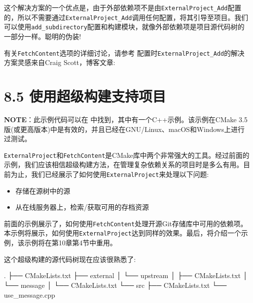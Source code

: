 这个解决方案的一个优点是，由于外部依赖项不是由\texttt{ExternalProject\_Add}配置的，所以不需要通过\texttt{ExternalProject\_Add}调用任何配置，将其引导至项目。我们可以使用\texttt{add\_subdirectory}配置和构建模块，就像外部依赖项是项目源代码树的一部分一样。聪明的伪装!


有关\texttt{FetchContent}选项的详细讨论，请参考 配置时\texttt{ExternalProject\_Add}的解决方案灵感来自Craig Scott，博客文章:


\section{8.5 使用超级构建支持项目}

\begin{myInfoBox}
\textbf{NOTE}：此示例代码可以在  中找到，其中有一个C++示例。该示例在CMake 3.5版(或更高版本)中是有效的，并且已经在GNU/Linux、macOS和Windows上进行过测试。
\end{myInfoBox}

\texttt{ExternalProject}和\texttt{FetchContent}是CMake库中两个非常强大的工具。经过前面的示例，我们应该相信超级构建方法，在管理复杂依赖关系的项目时是多么有用。目前为止，我们已经展示了如何使用\texttt{ExternalProject}来处理以下问题:

\begin{itemize}
\item 存储在源树中的源

\item 从在线服务器上，检索/获取可用的存档资源

\end{itemize}

前面的示例展示了，如何使用\texttt{FetchContent}处理开源Git存储库中可用的依赖项。本示例将展示，如何使用\texttt{ExternalProject}达到同样的效果。最后，将介绍一个示例，该示例将在第10章第4节中重用。


这个超级构建的源代码树现在应该很熟悉了:

\begin{codebox}[shell]
.
├── CMakeLists.txt
├── external
│    └── upstream
│        ├── CMakeLists.txt
│        └── message
│            └── CMakeLists.txt
└── src
    ├── CMakeLists.txt
    └── use_message.cpp
\end{codebox}

